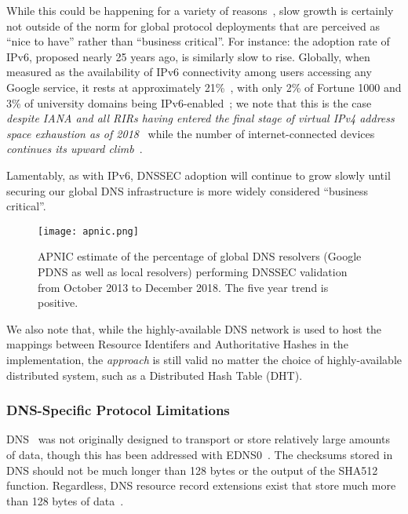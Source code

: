 While this could be happening for a variety of reasons~\cite{DNSSEC-is-hard-1,
DNSSEC-is-hard-2, DNSSEC-is-hard-3, DNSSEC-is-hard-4, DNSSEC-is-hard-5}, slow
growth is certainly not outside of the norm for global protocol deployments that
are perceived as ``nice to have'' rather than ``business critical''. For
instance: the adoption rate of IPv6, proposed nearly 25 years ago, is similarly
slow to rise. Globally, when measured as the availability of IPv6 connectivity
among users accessing any Google service, it rests at approximately
21\%~\cite{Google-IPv6}, with only 2\% of Fortune 1000 and 3\% of university
domains being IPv6-enabled~\cite{NIST-IPv6}; we note that this is the case
\emph{despite IANA and all RIRs having entered the final stage of virtual IPv4
address space exhaustion as of 2018}~\cite{APNIC-exhaustion} while the number of
internet-connected devices \emph{continues its upward climb}~\cite{Cisco}.

Lamentably, as with IPv6, DNSSEC adoption will continue to grow slowly until
securing our global DNS infrastructure is more widely considered ``business
critical''.

\begin{figure*}[t]
    \centering
    \texttt{[image: apnic.png]}
    \caption{APNIC estimate of the percentage of global DNS resolvers (Google
    PDNS as well as local resolvers) performing DNSSEC validation from October
    2013 to December 2018. The five year trend is positive.}\label{fig:apnic}
\end{figure*}

We also note that, while the highly-available DNS network is used to host the
mappings between Resource Identifers and Authoritative Hashes in the \SYSTEM{}
implementation, the \SYSTEM{} \emph{approach} is still valid no matter the
choice of highly-available distributed system, such as a Distributed Hash Table
(DHT).

\subsubsection{DNS-Specific Protocol Limitations}

DNS~\cite{DNS1} was not originally designed to transport or store relatively
large amounts of data, though this has been addressed with EDNS0~\cite{EDNS}.
The checksums stored in DNS should not be much longer than 128 bytes or the
output of the SHA512 function. Regardless, DNS resource record extensions exist
that store much more than 128 bytes of data~\cite{CERT, IPSECKEY, DANE3, DANE1}.

